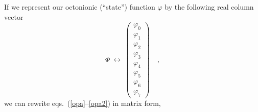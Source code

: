 \documentclass[a4paper,12pt]{book}
\begin{document}
If we represent our octonionic (``state'') function $\varphi $ by the
following real column vector 
\begin{equation}
\Phi ~\leftrightarrow ~\left( 
\begin{array}{c}
\varphi _{0} \\ 
\varphi _{1} \\ 
\varphi _{2} \\ 
\varphi _{3} \\ 
\varphi _{4} \\ 
\varphi _{5} \\ 
\varphi _{6} \\ 
\varphi _{7}
\end{array}
\right) \quad ,
\end{equation}
we can rewrite eqs.~(\ref{opa}--\ref{opa2}) in matrix form,
\end{document}
